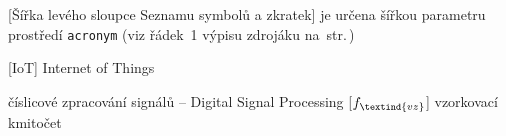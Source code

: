 \cleardoublepage
\chapter*{\listofabbrevname}
{}

\begin{acronym}[]

		[Šířka levého sloupce Seznamu symbolů a zkratek]								%
		{je určena šířkou parametru prostředí \texttt{acronym} (viz řádek~1 výpisu zdrojáku na~str.\,\pageref{lst:zkratky})}

		[IoT]
		{Internet of Things}

		{číslicové zpracování signálů -- Digital Signal Processing}
		[\ensuremath{f_\textind{vz}}] %
		{vzorkovací kmitočet}					%

\end{acronym}
